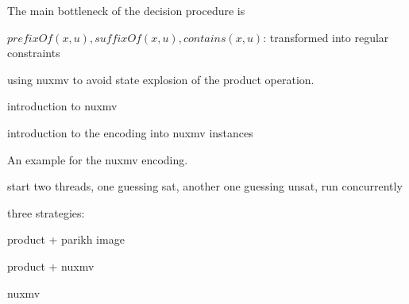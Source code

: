 The main bottleneck of the decision procedure is 

$prefixOf(x, u), suffixOf(x,u), contains(x, u)$: transformed into regular constraints

using nuxmv to avoid state explosion of the product operation.

introduction to nuxmv

introduction to the encoding into nuxmv instances

\begin{example}
An example for the nuxmv encoding.
\end{example}

start two threads, one guessing sat, another one guessing unsat, run concurrently

three strategies: 

product + parikh image

product + nuxmv

nuxmv


